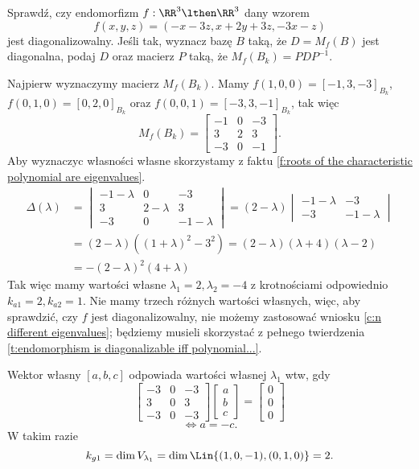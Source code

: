 \begin{example}
    Sprawdź, czy endomorfizm $f : \RR^3 \lthen \RR^3$ dany wzorem
    \[ f(x, y, z) = (-x-3z, x + 2y + 3z, -3x - z) \]
    jest diagonalizowalny. Jeśli tak, wyznacz bazę $B$ taką, że $D = M_f(B)$ jest diagonalna, podaj $D$ oraz macierz $P$ taką, że $M_f(B_k) = PDP^{-1}$.
\end{example}
\begin{solution}
    Najpierw wyznaczymy macierz $M_f(B_k)$. Mamy $f(1, 0, 0) = [-1, 3, -3]_{B_k}$, $f(0, 1, 0) = [0, 2, 0]_{B_k}$ oraz $f(0, 0, 1) = [-3, 3, -1]_{B_k}$, tak więc
    \[ M_f(B_k) = \begin{bmatrix}
        -1 & 0 & -3 \\
        3 & 2 & 3 \\
        -3 & 0 & -1
    \end{bmatrix}. \]
    Aby wyznaczyc własności własne skorzystamy z faktu \ref{f:roots of the characteristic polynomial are eigenvalues}.
    \begin{align*} \Delta(\lambda) &=
        \begin{vmatrix}
            -1 - \lambda & 0 & -3 \\
            3 & 2 - \lambda & 3 \\
            -3 & 0 & -1 - \lambda
        \end{vmatrix} = (2 - \lambda) \begin{vmatrix}
            -1 - \lambda & -3 \\
            -3 & -1 - \lambda
        \end{vmatrix} \\
        &= (2 - \lambda)((1 + \lambda)^2 - 3^2) = (2 - \lambda)(\lambda + 4)(\lambda - 2) \\
        &= -(2 - \lambda)^2(4 + \lambda)
    \end{align*}
    Tak więc mamy wartości własne $\lambda_1 = 2, \lambda_2 = -4$ z krotnościami odpowiednio $k_{a1} = 2, k_{a2} = 1$. Nie mamy trzech różnych wartości własnych, więc, aby sprawdzić, czy $f$ jest diagonalizowalny, nie możemy zastosować wniosku \ref{c:n different eigenvalues}; będziemy musieli skorzystać z pełnego twierdzenia \ref{t:endomorphism is diagonalizable iff polynomial...}.

    Wektor własny $[a, b, c]$ odpowiada wartości własnej $\lambda_1$ wtw, gdy
    \[ \begin{bmatrix}
        -3 & 0 & -3 \\
        3 & 0 & 3 \\
        -3 & 0 & -3
    \end{bmatrix}\begin{bmatrix}
        a \\ b \\ c
    \end{bmatrix} = \begin{bmatrix}
        0 \\ 0 \\ 0
    \end{bmatrix} \]
    \[ \iff a = -c. \]
    W takim razie
    \[ k_{g1} = \dim V_{\lambda_1} = \dim\Lin\{(1, 0, -1), (0, 1, 0)\} = 2. \]


\end{solution}
